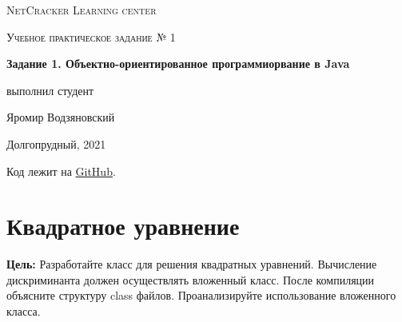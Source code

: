 \documentclass[a4paper]{article}
\begin{document}
\graphicspath{ {pictures/} }

\begin{titlepage}
	\centering
	\vspace{5cm}
    {\scshape\LARGE NetCracker Learning center\par}
	\vspace{5cm}
	{\scshape\Large  Учебное практическое задание № 1 \par}
	\vspace{1cm}
    {\huge\bfseries  Задание 1. Объектно-ориентированное программиорвание в Java \par}
	\vspace{1cm}
	\vfill
    \begin{flushright}
        {\large выполнил студент}\par
        \vspace{0.3cm}
        {\LARGE Яромир Водзяновский}
    \end{flushright}
	\vfill
Долгопрудный, 2021
\end{titlepage}

\pagestyle{fancy} 
\fancyfoot[C]{ \noindent\rule{\textwidth}{0.4pt} \thepage }



\newpage 


Код лежит на \href{https://github.com/yarvod/NetCracker_LearningCenter/tree/main/Practise_tasks/Practice_task_1}{GitHub}.

\section{Квадратное уравнение}

\textbf{Цель:} Разработайте класс для решения квадратных уравнений. Вычисление дискриминанта должен осуществлять вложенный класс. После компиляции объясните структуру class файлов. Проанализируйте использование вложенного класса. \par
\end{document}
